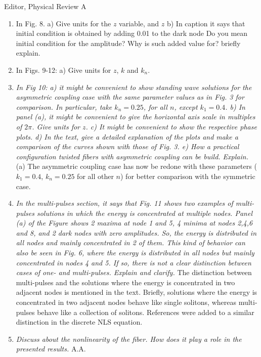 \documentclass[11pt]{letter}
\begin{document}
\begin{letter}{Editor, Physical Review A}
\begin{enumerate}
\item In Fig. 8. a) Give units for the $z$ variable, and $z$ b) In caption it says that initial condition is obtained by adding 0.01 to the dark node Do you mean initial condition for the amplitude? Why is such added value for? briefly explain.

\item In Figs. 9-12: a) Give units for $z$, $k$ and $k_n$.

\item \emph{In Fig 10: a) it might be convenient to show standing wave solutions for the asymmetric coupling case with the same parameter values as in Fig. 3 for comparison. In particular, take $k_n=0.25$, for all $n$, except $k_1=0.4$. b) In panel (a), it might be convenient to give the horizontal axis scale in multiples of $2\pi$. Give units for $z$. c) It might be convenient to show the respective phase plots. d) In the text, give a detailed explanation of the plots and make a comparison of the curves shown with those of Fig. 3. e) How a practical configuration twisted fibers with asymmetric coupling can be build. Explain.} (a) The asymmetric coupling case has now be redone with these parameters ($k_1 = 0.4$, $k_n=0.25$ for all other $n$) for better comparison with the symmetric case.

\item \emph{In the multi-pulses section, it says that Fig. 11 shows two examples of multi-pulses solutions in which the energy is concentrated at multiple nodes. Panel (a) of the Figure shows 2 maxima at node 1 and 5, 4 minima at nodes 2,4,6 and 8, and 2 dark nodes with zero amplitudes. So, the energy is distributed in all nodes and mainly concentrated in 2 of them. This kind of behavior can also be seen in Fig. 6, where the energy is distributed in all nodes but mainly concentrated in nodes 4 and 5. If so, there is not a clear distinction between cases of one- and multi-pulses. Explain and clarify.} The distinction between multi-pulses and the solutions where the energy is concentrated in two adjacent nodes is mentioned in the text. Briefly, solutions where the energy is concentrated in two adjacent nodes behave like single solitons, whereas multi-pulses behave like a collection of solitons. References were added to a similar distinction in the discrete NLS equation.

\item \emph{Discuss about the nonlinearity of the fiber. How does it play a role in the presented results.} A.A.


\end{enumerate}
\end{letter}
\end{document}
